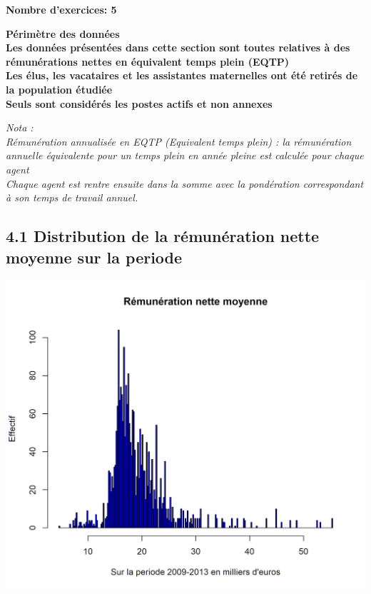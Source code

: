 \textbf{Nombre d'exercices: 5 }

\textbf{Périmètre des données}\\
\textbf{Les données présentées dans cette section sont toutes relatives
à des rémunérations nettes en équivalent temps plein (EQTP)}\\
\textbf{Les élus, les vacataires et les assistantes maternelles ont été
retirés de la population étudiée}\\
\textbf{Seuls sont considérés les postes actifs et non annexes}

\emph{Nota :}\\
\emph{Rémunération annualisée en EQTP (Equivalent temps plein) : la
rémunération annuelle équivalente pour un temps plein en année pleine
est calculée pour chaque agent}\\
\emph{Chaque agent est rentre ensuite dans la somme avec la pondération
correspondant à son temps de travail annuel. }

\hypertarget{distribution-de-la-remuneration-nette-moyenne-sur-la-periode}{%
\subsection{4.1 Distribution de la rémunération nette moyenne sur la
periode}\label{distribution-de-la-remuneration-nette-moyenne-sur-la-periode}}

\includegraphics{altair_files/figure-latex/unnamed-chunk-115-1.png}


